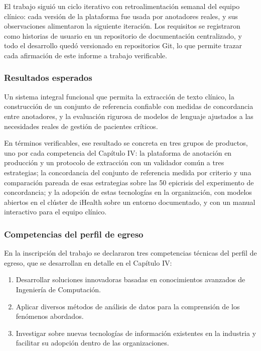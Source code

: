 \documentclass[12pt,letterpaper]{article}
\begin{document}
El trabajo siguió un ciclo iterativo con retroalimentación semanal del equipo clínico: cada versión de la plataforma fue usada por anotadores reales, y sus observaciones alimentaron la siguiente iteración. Los requisitos se registraron como historias de usuario en un repositorio de documentación centralizado, y todo el desarrollo quedó versionado en repositorios Git, lo que permite trazar cada afirmación de este informe a trabajo verificable.

\subsubsection{Resultados esperados}

Un sistema integral funcional que permita la extracción de texto clínico, la construcción de un conjunto de referencia confiable con medidas de concordancia entre anotadores, y la evaluación rigurosa de modelos de lenguaje ajustados a las necesidades reales de gestión de pacientes críticos.

En términos verificables, ese resultado se concreta en tres grupos de productos, uno por cada competencia del Capítulo IV: la plataforma de anotación en producción y un protocolo de extracción con un validador común a tres estrategias; la concordancia del conjunto de referencia medida por criterio y una comparación pareada de esas estrategias sobre las 50 epicrisis del experimento de concordancia; y la adopción de estas tecnologías en la organización, con modelos abiertos en el clúster de iHealth sobre un entorno documentado, y con un manual interactivo para el equipo clínico.

\subsubsection{Competencias del perfil de egreso}

En la inscripción del trabajo se declararon tres competencias técnicas del perfil de egreso, que se desarrollan en detalle en el Capítulo IV:

\begin{enumerate}
    \item Desarrollar soluciones innovadoras basadas en conocimientos avanzados de Ingeniería de Computación.
    \item Aplicar diversos métodos de análisis de datos para la comprensión de los fenómenos abordados.
    \item Investigar sobre nuevas tecnologías de información existentes en la industria y facilitar su adopción dentro de las organizaciones.
\end{enumerate}
\end{document}
